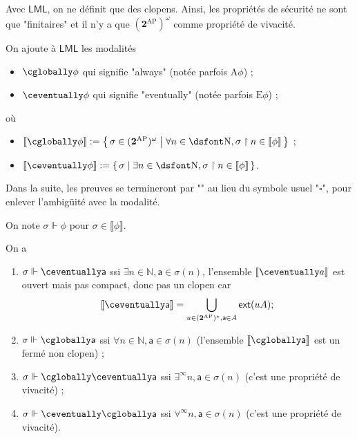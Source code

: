 \documentclass[./main]{subfiles}
\begin{document}
  \begin{rmk}
    Avec $\mathsf{LML}$, on ne définit que des clopens.
    Ainsi, les propriétés de sécurité ne sont que "finitaires" et il n'y a que $(\mathbf{2}^\mathrm{AP})^\omega$ comme propriété de vivacité.
  \end{rmk}

  \begin{defn}
    On ajoute à $\mathsf{LML}$ les modalités
    \begin{itemize}
      \item $\always \phi$ qui signifie "always" (notée parfois $\mathrm{A}\phi$) ;
      \item $\eventually \phi$ qui signifie "eventually" (notée parfois $\mathrm{E}\phi$) ;
    \end{itemize}
    où
    \begin{itemize}
      \item $\llbracket \always \phi\rrbracket := \mleft\{\,\sigma \in (\mathbf{2}^\mathrm{AP})^\omega \;\middle|\; \forall n \in \mathds{N}, \sigma \upharpoonright n \in \llbracket \phi\rrbracket \,\mright\}$ ;
      \item $\llbracket \eventually \phi \rrbracket := \mleft\{\,\sigma \;\middle|\; \exists n \in \mathds{N}, \sigma \upharpoonright n \in \llbracket \phi\rrbracket\,\mright\}$.
    \end{itemize}
  \end{defn}

  Dans la suite, les preuves se termineront par "\qedsymbol" au lieu du symbole usuel "$\square$", pour enlever l'ambigüité avec la modalité.

  \begin{nota}
    On note $\sigma \Vdash \phi$ pour $\sigma \in \llbracket \phi\rrbracket$.
  \end{nota}

  \begin{exm}
    On a 
    \begin{enumerate}
      \item $\sigma \Vdash \eventually \mathsf{a}$ ssi $\exists n \in \mathds{N}, \mathsf{a} \in \sigma(n)$,
        l'ensemble $\llbracket \eventually a\rrbracket $ est ouvert mais pas compact, donc pas un clopen car 
        \[
        \llbracket \eventually \mathsf{a} \rrbracket   = \bigcup_{u \in (\mathbf{2}^\mathrm{AP})^\star, \mathsf{a} \in A} \mathsf{ext}(u A)
        ;\] 
      \item $\sigma \Vdash \always \mathsf{a}$ ssi  $\forall n \in \mathds{N}, \mathsf{a} \in \sigma(n)$ (l'ensemble $\llbracket \always \mathsf{a} \rrbracket$ est un fermé non clopen) ;
      \item $\sigma \Vdash \always \eventually \mathsf{a}$ ssi $\exists^\infty n, \mathsf{a} \in \sigma(n)$ (c'est une propriété de vivacité) ;
      \item $\sigma \Vdash \eventually \always \mathsf{a}$ ssi $\forall^\infty n, \mathsf{a} \in \sigma(n)$ (c'est une propriété de vivacité).
    \end{enumerate}
  \end{exm}
\end{document}
